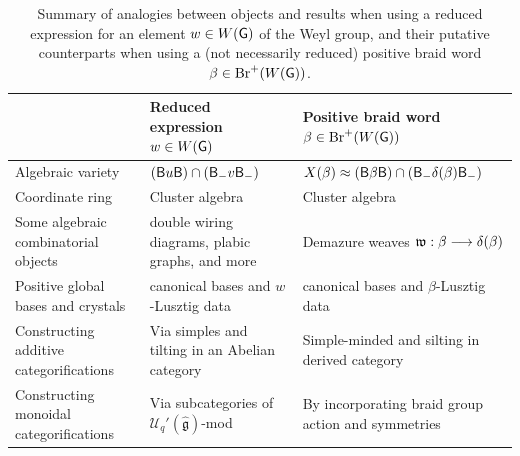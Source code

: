 \begin{table}[h!]
  \centering

\begin{tabular}{ |P{4cm}|P{5cm}|P{5cm}|}
	\hline
     & {\bf Reduced expression $w\in W(\G)$} & {\bf Positive braid word $\beta\in\operatorname{Br}^+(W(\mathsf{G}))$}\\
	\hline

    Algebraic variety & $(\mathsf{B} u\mathsf{B})\cap(\mathsf{B}_- v\mathsf{B}_-)$ & $X(\beta)\approx(\mathsf{B} \beta\mathsf{B})\cap(\mathsf{B}_- \delta(\beta)\mathsf{B}_-)$\\
	\hline

    \rule{0pt}{0.5cm}Coordinate ring & Cluster algebra & Cluster algebra\\
	\hline

    \rule{0pt}{0.5cm} Some algebraic combinatorial objects & double wiring diagrams, plabic graphs, and more & Demazure weaves $\mathfrak{w}:\beta\longrightarrow\delta(\beta)$\\
	\hline

    \rule{0pt}{0.5cm} Positive global bases and crystals & canonical bases and $w$-Lusztig data & canonical bases and $\beta$-Lusztig data\\
	\hline

    \rule{0pt}{0.5cm}Constructing additive categorifications & Via simples and tilting in an Abelian category & Simple-minded and silting in derived category\\
	\hline

    \rule{0pt}{0.5cm}Constructing monoidal categorifications & Via subcategories of $\mathcal{U}_q'(\widehat{\mathfrak{g}})$-mod& By incorporating braid group action and symmetries\\
    \hline
\end{tabular}
  \caption{Summary of analogies between objects and results when using a reduced expression for an element $w\in W(\G)$ of the Weyl group, and their putative counterparts when using a (not necessarily reduced) positive braid word $\beta\in\Br^+(W(\G))$.}  \label{table:summary_nonreduced}
\end{table}
\vspace{0.1cm}

